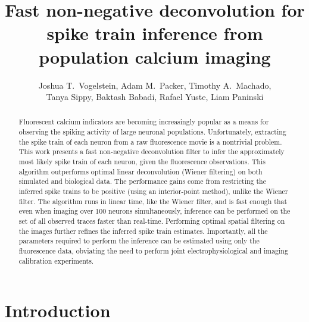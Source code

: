 %  
 
\usepackage{multicol}
\usepackage{hyperref}
\usepackage{algorithmic}
\usepackage{algorithm}
\newcommand{\zzz}{z}
\newcommand{\az}{\argmax_{\mb{M} \mb{C} \geq_\odot \ve{0}}}
\newcommand{\anx}{\argmax_{n_t \in \mathbb{N}_0 \forall t}}
\newcommand{\foopsi}{fast }


\title{Fast non-negative deconvolution for spike train inference from population calcium imaging}

\author{Joshua T.~Vogelstein, Adam M.~Packer, Timothy A.~Machado, \\ Tanya Sippy, Baktash Babadi, Rafael Yuste, Liam Paninski}



\maketitle
\begin{abstract}
Fluorescent calcium indicators are becoming increasingly popular as a means for observing the spiking activity of large neuronal populations. Unfortunately, extracting the spike train of each neuron from a raw fluorescence movie is a nontrivial problem.  This work presents a fast non-negative deconvolution filter to infer the approximately most likely spike train of each neuron, given the fluorescence observations. This algorithm outperforms optimal linear deconvolution (Wiener filtering) on both simulated and biological data. The performance gains come from restricting the inferred spike trains to be positive (using an interior-point method), unlike the Wiener filter.  The algorithm runs in linear time, like the Wiener filter, and is fast enough that even when imaging over 100 neurons simultaneously, inference can be performed on the set of all observed traces faster than real-time.  Performing optimal spatial filtering on the images further refines the inferred spike train estimates.  Importantly, all the parameters required to perform the inference can be estimated using only the fluorescence data, obviating the need to perform joint electrophysiological and imaging calibration experiments. 
\end{abstract}

\section{Introduction}

